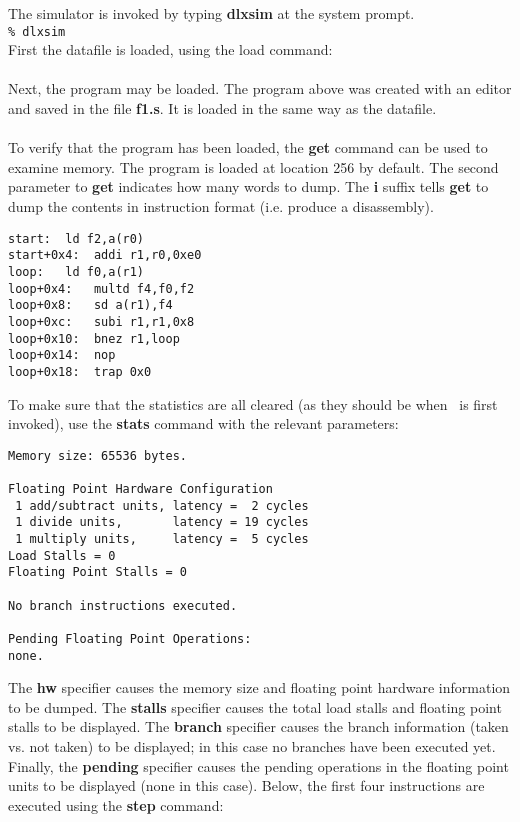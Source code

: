The simulator is invoked by typing {\bf dlxsim} at the system prompt. \\

{\tt \% dlxsim} \\

First the datafile is loaded, using the load command: \\

 \\

Next, the program may be loaded.  The program above was created with an
editor and saved in the file {\bf f1.s}.  It is loaded in the same way
as the datafile. \\

 \\

To verify that the program has been loaded, the {\bf get} command can
be used to examine memory.  The program is loaded at location 256 by
default.  The second parameter to {\bf get} indicates how many words
to dump.  The {\bf i} suffix tells {\bf get} to dump the contents in
instruction format (i.e.  produce a disassembly). \\

\begin{verbatim}
start:	ld f2,a(r0)
start+0x4:	addi r1,r0,0xe0
loop:	ld f0,a(r1)
loop+0x4:	multd f4,f0,f2
loop+0x8:	sd a(r1),f4
loop+0xc:	subi r1,r1,0x8
loop+0x10:	bnez r1,loop
loop+0x14:	nop
loop+0x18:	trap 0x0
\end{verbatim}

To make sure that the statistics are all cleared (as they should be when
\dlxsim\ is first invoked), use the {\bf stats} command with the relevant
parameters: \\

\begin{verbatim}
Memory size: 65536 bytes.

Floating Point Hardware Configuration
 1 add/subtract units, latency =  2 cycles
 1 divide units,       latency = 19 cycles
 1 multiply units,     latency =  5 cycles
Load Stalls = 0
Floating Point Stalls = 0

No branch instructions executed.

Pending Floating Point Operations:
none.
\end{verbatim}

The {\bf hw} specifier causes the memory size and floating point hardware
information to be dumped.  The {\bf stalls} specifier causes the total
load stalls and floating point stalls to be displayed.  The {\bf branch}
specifier causes the branch information (taken vs. not taken) to be displayed;
in this case no branches have been executed yet.  Finally, the {\bf pending}
specifier causes the pending operations in the floating point units to
be displayed (none in this case).
Below, the first four instructions are executed using the {\bf step}
command: \\

